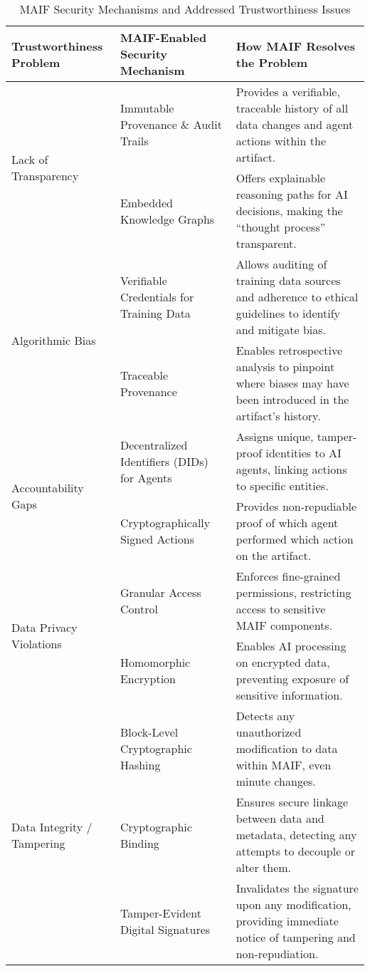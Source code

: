 \documentclass[conference]{IEEEtran}
\begin{document}
\begin{table*}[!t]
\renewcommand{\arraystretch}{1.3}
\caption{MAIF Security Mechanisms and Addressed Trustworthiness Issues}
\label{tab:maif-security}
\centering
\footnotesize
\begin{tabular}{p{3cm}p{5cm}p{5.5cm}}
\toprule
\textbf{Trustworthiness Problem} & \textbf{MAIF-Enabled Security Mechanism} & \textbf{How MAIF Resolves the Problem} \\
\midrule
\multirow{2}{3cm}{Lack of Transparency} & Immutable Provenance \& Audit Trails\cite{ref9} & Provides a verifiable, traceable history of all data changes and agent actions within the artifact. \\
& Embedded Knowledge Graphs\cite{ref42} & Offers explainable reasoning paths for AI decisions, making the ``thought process'' transparent. \\
\midrule
\multirow{2}{3cm}{Algorithmic Bias} & Verifiable Credentials for Training Data\cite{ref4} & Allows auditing of training data sources and adherence to ethical guidelines to identify and mitigate bias. \\
& Traceable Provenance\cite{ref9} & Enables retrospective analysis to pinpoint where biases may have been introduced in the artifact's history. \\
\midrule
\multirow{2}{3cm}{Accountability Gaps} & Decentralized Identifiers (DIDs) for Agents\cite{ref4} & Assigns unique, tamper-proof identities to AI agents, linking actions to specific entities. \\
& Cryptographically Signed Actions\cite{ref65} & Provides non-repudiable proof of which agent performed which action on the artifact. \\
\midrule
\multirow{2}{3cm}{Data Privacy Violations} & Granular Access Control\cite{ref69} & Enforces fine-grained permissions, restricting access to sensitive MAIF components. \\
& Homomorphic Encryption\cite{ref93} & Enables AI processing on encrypted data, preventing exposure of sensitive information. \\
\midrule
\multirow{4}{3cm}{Data Integrity / Tampering} & Block-Level Cryptographic Hashing\cite{ref72} & Detects any unauthorized modification to data within MAIF, even minute changes. \\
& Cryptographic Binding\cite{ref66} & Ensures secure linkage between data and metadata, detecting any attempts to decouple or alter them. \\
& Tamper-Evident Digital Signatures\cite{ref65} & Invalidates the signature upon any modification, providing immediate notice of tampering and non-repudiation. \\

\end{tabular}
\end{table*}
\end{document}
